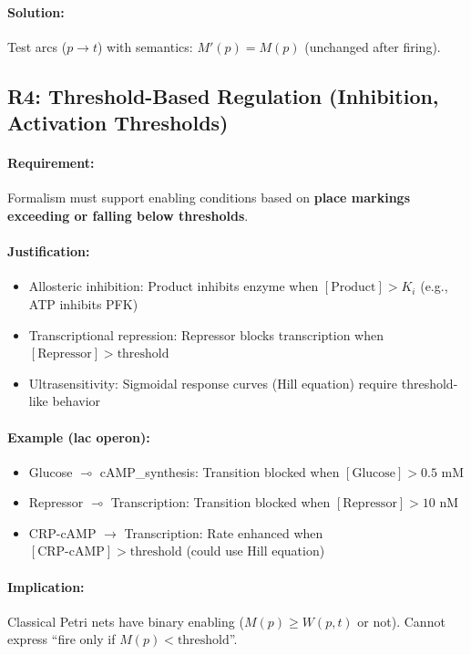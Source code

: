 \paragraph{Solution:} Test arcs ($p \to t$) with semantics: $M'(p) = M(p)$ (unchanged after firing).

\subsection{R4: Threshold-Based Regulation (Inhibition, Activation Thresholds)}
\label{subsec:r4-threshold}

\paragraph{Requirement:} Formalism must support enabling conditions based on \textbf{place markings exceeding or falling below thresholds}.

\paragraph{Justification:}
\begin{itemize}
    \item Allosteric inhibition: Product inhibits enzyme when $[\text{Product}] > K_i$ (e.g., ATP inhibits PFK)
    \item Transcriptional repression: Repressor blocks transcription when $[\text{Repressor}] > \text{threshold}$
    \item Ultrasensitivity: Sigmoidal response curves (Hill equation) require threshold-like behavior
\end{itemize}

\paragraph{Example (lac operon):}
\begin{itemize}
    \item Glucose $\multimap$ cAMP\_synthesis: Transition blocked when $[\text{Glucose}] > 0.5$ mM
    \item Repressor $\multimap$ Transcription: Transition blocked when $[\text{Repressor}] > 10$ nM
    \item CRP-cAMP $\to$ Transcription: Rate enhanced when $[\text{CRP-cAMP}] > \text{threshold}$ (could use Hill equation)
\end{itemize}

\paragraph{Implication:} Classical Petri nets have binary enabling ($M(p) \geq W(p,t)$ or not). Cannot express ``fire only if $M(p) < \text{threshold}$''.

